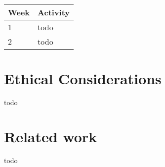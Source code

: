 \documentclass{article}
\begin{document}
\begin{tabular}[H]{ | l | p{10.2cm} | }
	\hline
	\textbf{Week} & \textbf{Activity} \\
	\hline 1 & todo \\
	\hline 2 & todo \\
	\hline
\end{tabular}


\section{Ethical Considerations}

todo


\section{Related work}

todo


\printbibliography
\end{document}
